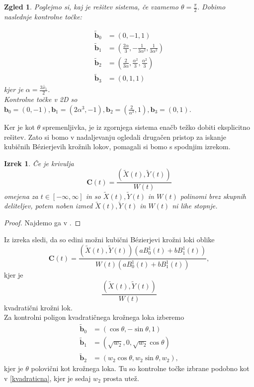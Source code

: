 \documentclass[a4paper,11pt]{article}
\theoremstyle{definition}
\theoremstyle{plain}
\newtheorem*{izrek}{Izrek}
\newtheorem*{zgled}{Zgled}
\begin{document}
\begin{zgled}
Poglejmo si, kaj je rešitev sistema, če vzamemo $\theta= \frac{\pi}{2}$. Dobimo naslednje kontrolne točke:

\begin{align*}
\boldsymbol{\tilde{b}}_0 &= (0,-1,1) \\
\boldsymbol{\tilde{b}}_1 &= (\frac{2\alpha}{3},-\frac{1}{3\alpha^2},\frac{1}{3\alpha^2}) \\
\boldsymbol{\tilde{b}}_2 &= (\frac{2}{3\alpha},\frac{\alpha^2}{3},\frac{\alpha^2}{3}) \\
\boldsymbol{\tilde{b}}_3 &= (0,1,1)
\end{align*}
kjer je $\alpha=\frac{3\tilde{x_1}}{2}$. \\
Kontrolne točke v 2D so $\boldsymbol{b}_0 = (0,-1),\boldsymbol{b}_1 = (2\alpha^3,-1),\boldsymbol{b}_2 = (\frac{2}{\alpha^3},1),\boldsymbol{b}_3 = (0,1)$.
\end{zgled}

Ker je kot $\theta$ spremenljivka, je iz zgornjega sistema enačb težko dobiti eksplicitno rešitev. Zato si bomo v nadaljevanju ogledali drugačen pristop za iskanje kubičnih B\'ezierjevih krožnih lokov, pomagali si bomo s spodnjim izrekom.

\begin{izrek}
Če je krivulja
$$\boldsymbol{C}(t)=\frac{(\tilde{X}(t),\tilde{Y}(t))}{W(t)}$$
omejena za $t\in [-\infty,\infty]$ in so $\tilde{X}(t),\tilde{Y}(t)$ in $W(t)$ polinomi brez skupnih deliteljev, potem noben izmed $\tilde{X}(t),\tilde{Y}(t)$ in $W(t)$ ni lihe stopnje.
\end{izrek}

\begin{proof}
Najdemo ga v \cite{chou}.
\end{proof}

\noindent
Iz izreka sledi, da so edini možni kubični B\'ezierjevi krožni loki oblike
$$\boldsymbol{C}(t)=\frac{(\tilde{X}(t),\tilde{Y}(t))(aB_0^1(t)+bB_1^1(t))}{W(t)(aB_0^1(t)+bB_1^1(t))},$$
kjer je $$\frac{(\tilde{X}(t),\tilde{Y}(t))}{W(t)}$$
kvadratični krožni lok.\\

\noindent
Za kontrolni poligon kvadratičnega krožnega loka izberemo
\begin{align*}
\boldsymbol{\tilde{b}}_0 &= (\cos{\theta}, -\sin{\theta}, 1)\\
\boldsymbol{\tilde{b}}_1 &= (\sqrt{w_2}, 0,\sqrt{w_2} \cos{\theta})\\
\boldsymbol{\tilde{b}}_2 &= (w_2\cos \theta, w_2 \sin\theta, w_2),
\end{align*}
kjer je $\theta$ polovični kot krožnega loka. Tu so kontrolne točke izbrane podobno kot v \ref{kvadraticna}, kjer je sedaj $w_2$ prosta utež.
\end{document}
